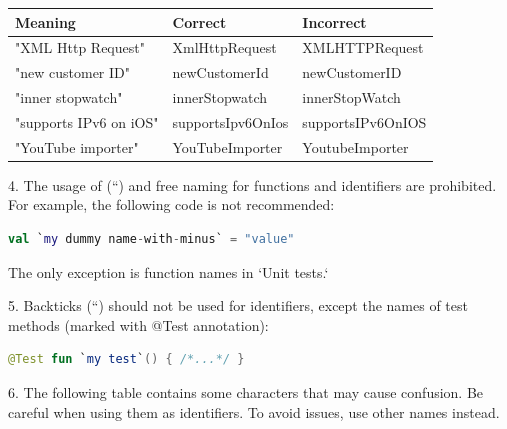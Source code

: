\begin{center}

\begin{tabular}{ |p{}|p{}|p{}| }

\hline

Meaning&Correct&Incorrect\\

\hline

 "XML Http Request" & XmlHttpRequest & XMLHTTPRequest \\

 "new customer ID" & newCustomerId & newCustomerID \\

 "inner stopwatch" & innerStopwatch & innerStopWatch \\

 "supports IPv6 on iOS" & supportsIpv6OnIos & supportsIPv6OnIOS \\

 "YouTube importer" & YouTubeImporter & YoutubeImporter \\

\hline

\end{tabular}

\end{center}

4.	The usage of (``) and free naming for functions and identifiers are prohibited. For example, the following code is not recommended:



\begin{lstlisting}[language=Kotlin]
val `my dummy name-with-minus` = "value" 
\end{lstlisting}


The only exception is function names in `Unit tests.`



5.	Backticks (``) should not be used for identifiers, except the names of test methods (marked with @Test annotation):

\begin{lstlisting}[language=Kotlin]
 @Test fun `my test`() { /*...*/ }
\end{lstlisting}
6.  The following table contains some characters that may cause confusion. Be careful when using them as identifiers. To avoid issues, use other names instead.

